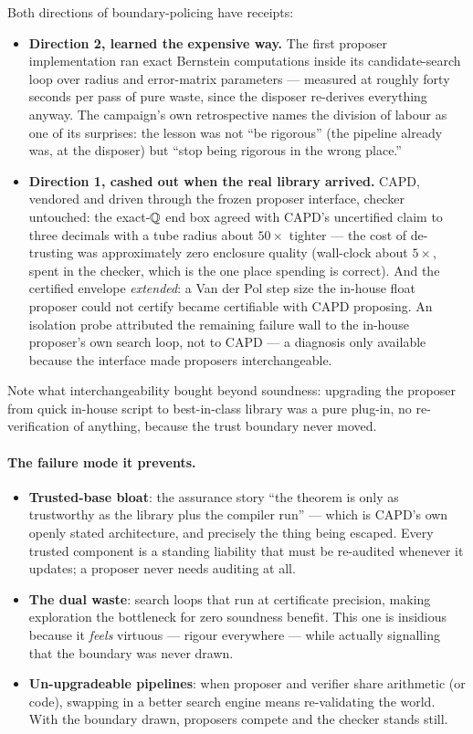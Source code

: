 Both directions of boundary-policing have receipts:

\begin{itemize}
\item \textbf{Direction 2, learned the expensive way.} The first
  proposer implementation ran exact Bernstein computations inside its
  candidate-search loop over radius and error-matrix parameters ---
  measured at roughly forty seconds per pass of pure waste, since the
  disposer re-derives everything anyway. The campaign's own
  retrospective names the division of labour as one of its surprises:
  the lesson was not ``be rigorous'' (the pipeline already was, at the
  disposer) but ``stop being rigorous in the wrong place.''
\item \textbf{Direction 1, cashed out when the real library arrived.}
  CAPD, vendored and driven through the frozen proposer interface,
  checker untouched: the exact-$\mathbb{Q}$ end box agreed with CAPD's
  uncertified claim to three decimals with a tube radius about
  $50\times$ tighter --- the cost of de-trusting was approximately zero
  enclosure quality (wall-clock about $5\times$, spent in the checker,
  which is the one place spending is correct). And the certified
  envelope \emph{extended}: a Van der Pol step size the in-house float
  proposer could not certify became certifiable with CAPD proposing. An
  isolation probe attributed the remaining failure wall to the in-house
  proposer's own search loop, not to CAPD --- a diagnosis only
  available because the interface made proposers interchangeable.
\end{itemize}

Note what interchangeability bought beyond soundness: upgrading the
proposer from quick in-house script to best-in-class library was a pure
plug-in, no re-verification of anything, because the trust boundary
never moved.

\paragraph{The failure mode it prevents.}
\begin{itemize}
\item \textbf{Trusted-base bloat}: the assurance story ``the theorem is
  only as trustworthy as the library plus the compiler run'' --- which
  is CAPD's own openly stated architecture, and precisely the thing
  being escaped. Every trusted component is a standing liability that
  must be re-audited whenever it updates; a proposer never needs
  auditing at all.
\item \textbf{The dual waste}: search loops that run at certificate
  precision, making exploration the bottleneck for zero soundness
  benefit. This one is insidious because it \emph{feels} virtuous ---
  rigour everywhere --- while actually signalling that the boundary was
  never drawn.
\item \textbf{Un-upgradeable pipelines}: when proposer and verifier
  share arithmetic (or code), swapping in a better search engine means
  re-validating the world. With the boundary drawn, proposers compete
  and the checker stands still.
\end{itemize}

